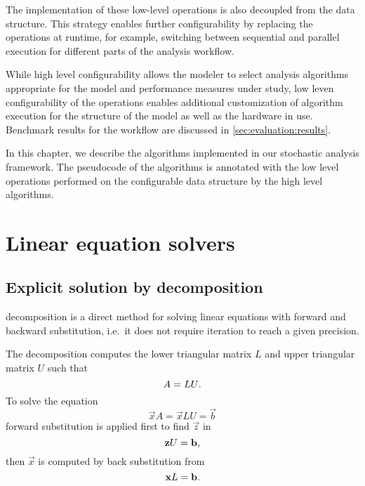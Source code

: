 The implementation of these low-level operations is also decoupled
from the data structure. This strategy enables further configurability
by replacing the operations at runtime, for example, switching between
sequential and parallel execution for different parts of the analysis
workflow.

While high level configurability allows the modeler to select analysis
algorithms appropriate for the model and performance measures under
study, low leven configurability of the operations enables additional
customization of algorithm execution for the structure of the model as
well as the hardware in use. Benchmark results for the workflow are
discussed in \vref{sec:evaluation:results}.

In this chapter, we describe the algorithms implemented in our
stochastic analysis framework. The pseudocode of the algorithms is
annotated with the low level operations performed on the configurable
data structure by the high level algorithms.

\section{Linear equation solvers}
\label{sec:algorithms:solvers}

\subsection{Explicit solution by  decomposition}

 decomposition is a direct method for solving linear
equations with forward and backward substitution, i.e.~it does not
require iteration to reach a given precision.

The decomposition computes the lower triangular matrix $L$ and upper
triangular matrix $U$ such that
\begin{equation}
  A = LU \text.
\end{equation}
To solve the equation
\begin{equation}
  \vec{x} A = \vec{x} LU = \vec{b}
\end{equation}
forward substitution is applied first to find $\vec{z}$ in
\begin{equation}
  \vec{z} U = \vec{b}\text,
\end{equation}
then $\vec{x}$ is computed by back substitution from
\begin{equation}
  \vec{x} L = \vec{b}\text.
\end{equation}

